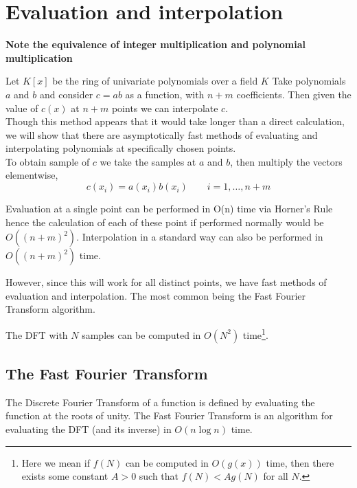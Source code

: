 
\chapter{Evaluation and interpolation}\label{chapter2}

\textbf{Note the equivalence of integer multiplication and polynomial multiplication}

Let $K[x]$ be the ring of univariate polynomials over a field $K$
Take polynomials $a$ and $b$ and consider $c = ab$ as a function, with $n + m$ coefficients. Then given the value of $c(x)$ at $n + m$ points we can interpolate $c$.\\
Though this method appears that it would take longer than a direct calculation, we will show that there are asymptotically fast methods of evaluating and interpolating polynomials at specifically chosen points.\\

To obtain sample of $c$ we take the samples at $a$ and $b$, then multiply the vectors elementwise,
\[
  c(x_i) = a(x_i)b(x_i) \qquad i = 1, \ldots, n + m
\]

Evaluation at a single point can be performed in O(n) time via Horner's Rule hence the calculation of each of these point if performed normally would be $O((n + m)^2)$. Interpolation in a standard way can also be performed in $O((n+m)^2)$ time.

However, since this will work for all distinct points, we have fast methods of evaluation and interpolation. The most common being the Fast Fourier Transform algorithm.

\begin{theorem}
The DFT with $N$ samples can be computed in $O(N^2)$ time\footnote{Here we mean if $f(N)$ can be computed in $O(g(x))$ time, then there exists some constant $A > 0$ such that $f(N) < Ag(N)$ for all $N$.}.
\end{theorem}

\section{The Fast Fourier Transform}

The Discrete Fourier Transform of a function is defined by evaluating the function at the roots of unity. The Fast Fourier Transform is an algorithm for evaluating the DFT (and its inverse) in $O(n \log n)$ time.



